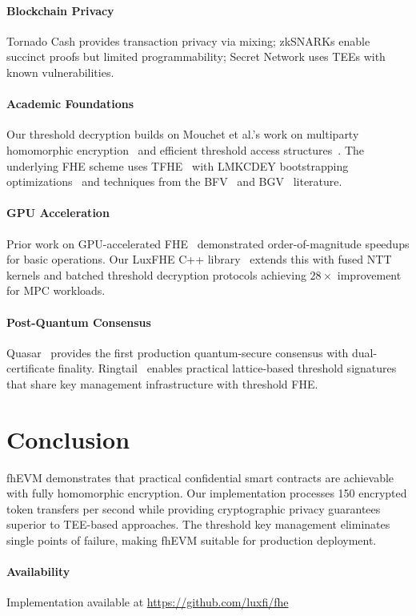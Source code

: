 \documentclass{../shared/luxfhe}
\begin{document}
\paragraph{Blockchain Privacy}
Tornado Cash provides transaction privacy via mixing; zkSNARKs enable succinct proofs but limited programmability; Secret Network uses TEEs with known vulnerabilities.

\paragraph{Academic Foundations}
Our threshold decryption builds on Mouchet et al.'s work on multiparty homomorphic encryption~\cite{mhe-rlwe} and efficient threshold access structures~\cite{threshold-rlwe}. The underlying FHE scheme uses TFHE~\cite{tfhe} with LMKCDEY bootstrapping optimizations~\cite{lmkcdey} and techniques from the BFV~\cite{bfv} and BGV~\cite{bgv} literature.

\paragraph{GPU Acceleration}
Prior work on GPU-accelerated FHE~\cite{gpu-fhe} demonstrated order-of-magnitude speedups for basic operations. Our LuxFHE C++ library~\cite{luxcpp-fhe} extends this with fused NTT kernels and batched threshold decryption protocols achieving $28\times$ improvement for MPC workloads.

\paragraph{Post-Quantum Consensus}
Quasar~\cite{quasar} provides the first production quantum-secure consensus with dual-certificate finality. Ringtail~\cite{ringtail} enables practical lattice-based threshold signatures that share key management infrastructure with threshold FHE.

\section{Conclusion}

fhEVM demonstrates that practical confidential smart contracts are achievable with fully homomorphic encryption. Our implementation processes 150 encrypted token transfers per second while providing cryptographic privacy guarantees superior to TEE-based approaches. The threshold key management eliminates single points of failure, making fhEVM suitable for production deployment.

\paragraph{Availability} Implementation available at \url{https://github.com/luxfi/fhe}



\end{document}
